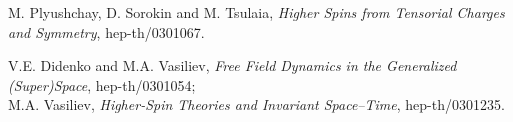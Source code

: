 \documentclass[a4paper,11pt]{article}
\begin{document}
{\begin{thebibliography}{99}
 M. Plyushchay, D. Sorokin and M. Tsulaia, {\sl 
Higher Spins from Tensorial Charges and \coordHE{} Symmetry}, 
hep-th/0301067. 

V.E. Didenko and M.A. Vasiliev, 
{\sl Free Field Dynamics in the Generalized \coordHE{} (Super)Space}, 
hep-th/0301054; \\ M.A. Vasiliev, {\sl    
Higher-Spin Theories and \coordHE{} Invariant Space--Time}, hep-th/0301235.

\end{thebibliography}
}
\end{document}
